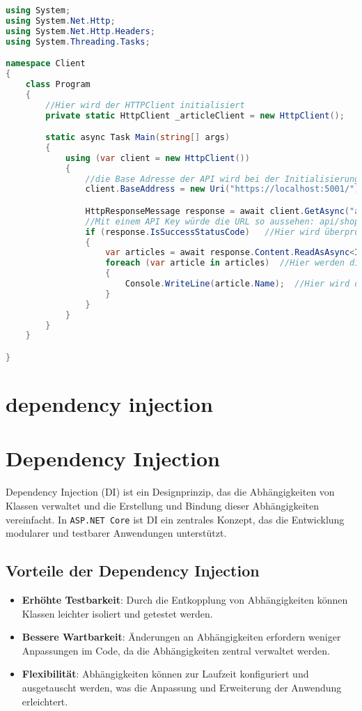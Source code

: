 \documentclass[a4paper,12pt]{report}
\begin{document}
\begin{lstlisting}[language=csharp, caption=Beispiel für einen API-Controller in C\#]
using System;
using System.Net.Http;
using System.Net.Http.Headers;
using System.Threading.Tasks;

namespace Client
{
    class Program 
    {
        //Hier wird der HTTPClient initialisiert
        private static HttpClient _articleClient = new HttpClient();

        static async Task Main(string[] args)
        {
            using (var client = new HttpClient())
            {
                //die Base Adresse der API wird bei der Initialisierung des HTTPClient angegeben und wird bei jeder Anfrage verwendet
                client.BaseAddress = new Uri("https://localhost:5001/");

                HttpResponseMessage response = await client.GetAsync("api/shop/articles");
                //Mit einem API Key würde die URL so aussehen: api/shop/articles?apiKey=1234
                if (response.IsSuccessStatusCode)   //Hier wird überprüft ob die Anfrage erfolgreich war
                {
                    var articles = await response.Content.ReadAsAsync<IEnumerable<Article>>();  //Hier werden die Daten in eine Liste von Artikeln umgewandelt
                    foreach (var article in articles)  //Hier werden die Daten durchgegangen
                    {
                        Console.WriteLine(article.Name);  //Hier wird der Name des Artikels ausgegeben
                    }
                }
            }
        }
    }

}
\end{lstlisting}

\section{dependency injection}
\section{Dependency Injection}
Dependency Injection (DI) ist ein Designprinzip, das die Abhängigkeiten von Klassen verwaltet und die Erstellung und Bindung dieser Abhängigkeiten vereinfacht. In \texttt{ASP.NET Core} ist DI ein zentrales Konzept, das die Entwicklung modularer und testbarer Anwendungen unterstützt.

\subsection{Vorteile der Dependency Injection}
\begin{itemize}
    \item \textbf{Erhöhte Testbarkeit}: Durch die Entkopplung von Abhängigkeiten können Klassen leichter isoliert und getestet werden.
    \item \textbf{Bessere Wartbarkeit}: Änderungen an Abhängigkeiten erfordern weniger Anpassungen im Code, da die Abhängigkeiten zentral verwaltet werden.
    \item \textbf{Flexibilität}: Abhängigkeiten können zur Laufzeit konfiguriert und ausgetauscht werden, was die Anpassung und Erweiterung der Anwendung erleichtert.
\end{itemize}
\end{document}
